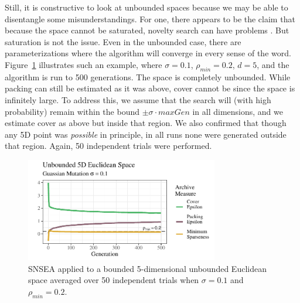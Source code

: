\documentclass[twoside]{article}
\begin{document}
Still, it is constructive to look at unbounded spaces because we may be able to disentangle some misunderstandings.  For one, there appears to be the claim that because the space cannot be saturated, novelty search can have problems \citep{LehmanStanley2008ssls,Doncieux2019gecco}.  But saturation is not the issue.  Even in the unbounded case, there are parameterizations where the algorithm will converge in every sense of the word.  Figure~\ref{fig:unbounded:nopop:0102} illustrates such an example, where $\sigma=0.1$, $\rho_{min}= 0.2$, $d=5$, and the algorithm is run to 500 generations.  The space is completely unbounded.  While packing can still be estimated as it was above, cover cannot be since the space is infinitely large.  To address this, we assume that the search will (with high probability) remain within the bound $\pm\sigma\cdot maxGen$ in all dimensions, and we estimate cover as above but inside that region.  We also confirmed that though any 5D point was \emph{possible} in principle, in all runs none were generated outside that region.  Again, 50 independent trials were performed.
%
\begin{figure}[h]
  \center\includegraphics[width=0.75\textwidth]{Figures/unbounded-s01-r02-NOPOP.pdf}
  \caption{\label{fig:unbounded:nopop:0102} SNSEA applied to a bounded 5-dimensional unbounded Euclidean space averaged over 50 independent trials when $\sigma=0.1$ and $\rho_{min}=0.2$.}
\end{figure}
\end{document}
